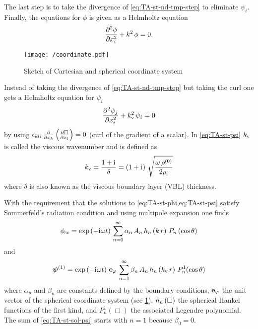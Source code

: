 The last step is to take the divergence of \cref{eq:TA-st-nd-tmp-step} to 
eliminate $\psi_{i}$. Finally, the equations for $\phi$ is given as a Helmholtz 
equation
\begin{equation}
  \pdv[2]{\phi}{x_{i}} + k^{2}\,\phi = 0.
  \label{eq:TA-st-phi}
\end{equation}

\begin{figure}[tbp]
  \centering
  \texttt{[image: /coordinate.pdf]}
  \caption{Sketch of Cartesian and spherical coordinate system}
  \label{fig:TA-coordinate}
\end{figure}

Instead of taking the divergence of \cref{eq:TA-st-nd-tmp-step} but taking the 
curl one gets a Helmholtz equation for $\psi_{i}$
\begin{equation}
  \pdv[2]{\psi_{j}}{x_{i}} + k_{\mathrm{v}}^{2}\,\psi_{i} = 0
  \label{eq:TA-st-psi}
\end{equation}
by using $\epsilon_{kli}\,\pdv{x_{k}}\left( \pdv{\Box}{x_{l}} \right) = 0$ 
(curl of the gradient of a scalar). In \cref{eq:TA-st-psi} $k_{\mathrm{v}}$ is 
called the viscous wavenumber and is defined as
\begin{equation}
  k_{\mathrm{v}} = \frac{1 + \mathrm{i}\mkern1mu}{\delta} = \left( 1 + \mathrm{i}\mkern1mu \right)\, 
  \sqrt{\frac{\omega\,\rho^{(0)}}{2\rho_{\mathrm{f}}}}
  \label{eq:TA-st-visc-wavenumber}
\end{equation}
where $\delta$ is also known as the viscous boundary layer (VBL) thickness.

With the requirement that the solutions to \cref{eq:TA-st-phi,eq:TA-st-psi} 
satisfy Sommerfeld's radiation condition and using multipole expansion one 
finds
\begin{equation}
  \phi_{\mathrm{sc}} = \exp\left( -\mathrm{i}\mkern1mu\omega t \right)\,
  \sum\limits^{\infty}_{n=0} 
  \alpha_{n}\,A_{n}\,h_{n}\left(k\,r\right)\,P_{n}\left(\cos\theta\right)
  \label{eq:TA-st-sol-phi}
\end{equation}
and
\begin{equation}
  \vb*{\psi}^{(1)} = \exp\left( -\mathrm{i}\mkern1mu\omega t \right)\,\vb{e}_{\varphi}\,
  \sum\limits^{\infty}_{n=1} 
  \beta_{n}\,A_{n}\,h_{n}\left(k_{\mathrm{v}}\,r\right)\,P^{1}_{n}(\cos\theta)
  \label{eq:TA-st-sol-psi}
\end{equation}
where $\alpha_{n}$ and $\beta_{n}$ are constants defined by the boundary 
conditions, $\vb{e}_{\varphi}$ the unit vector of the spherical coordinate 
system (see \cref{fig:TA-coordinate}), $h_{n}\left(\Box\right)$ the spherical Hankel 
functions of the first kind, and $P^{1}_{n}\left( \Box \right)$ the associated 
Legendre polynomial. The sum of \cref{eq:TA-st-sol-psi} starts with $n=1$ 
because $\beta_{0}=0$.


